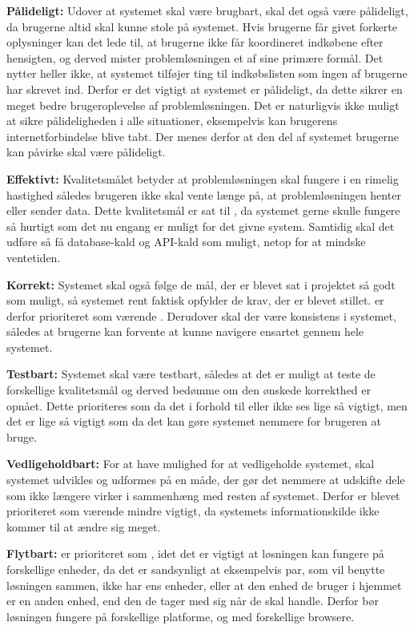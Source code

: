 \textbf{Pålideligt:}
Udover at systemet skal være brugbart, skal det også være pålideligt, da brugerne altid skal kunne stole på systemet. Hvis brugerne får givet forkerte oplysninger kan det lede til, at brugerne ikke får koordineret indkøbene efter hensigten, og derved mister problemløsningen et af sine primære formål. Det nytter heller ikke, at systemet tilføjer ting til indkøbslisten som ingen af brugerne har skrevet ind. Derfor er det vigtigt at systemet er pålideligt, da dette sikrer en meget bedre brugeroplevelse af problemløsningen. Det er naturligvis ikke muligt at sikre pålideligheden i alle situationer, eksempelvis kan brugerens internetforbindelse blive tabt. Der menes derfor at den del af systemet brugerne kan påvirke skal være pålideligt.

\textbf{Effektivt:}
Kvalitetsmålet  betyder at problemløsningen skal fungere i en rimelig hastighed således brugeren ikke skal vente længe på, at problemløsningen henter eller sender data. Dette kvalitetsmål er sat til , da systemet gerne skulle fungere så hurtigt som det nu engang er muligt for det givne system. Samtidig skal det udføre så få database-kald og API-kald som muligt, netop for at mindske ventetiden.

\textbf{Korrekt:}
Systemet skal også følge de mål, der er blevet sat i projektet så godt som muligt, så systemet rent faktisk opfylder de krav, der er blevet stillet.  er derfor prioriteret som værende . Derudover skal der være konsistens i systemet, således at brugerne kan forvente at kunne navigere ensartet gennem hele systemet. 

\textbf{Testbart:}
Systemet skal være testbart, således at det er muligt at teste de forskellige kvalitetsmål og derved bedømme om den ønskede korrekthed er opnået. Dette prioriteres som  da det i forhold til  eller  ikke ses lige så vigtigt, men det er lige så vigtigt som  da det kan gøre systemet nemmere for brugeren at bruge.

\textbf{Vedligeholdbart:}
For at have mulighed for at vedligeholde systemet, skal systemet udvikles og udformes på en måde, der gør det nemmere at udskifte dele som ikke længere virker i sammenhæng med resten af systemet. Derfor er  blevet prioriteret som værende mindre vigtigt, da systemets informationskilde ikke kommer til at ændre sig meget.

\textbf{Flytbart:}
 er prioriteret som , idet det er vigtigt at løsningen kan fungere på forskellige enheder, da det er sandsynligt at eksempelvis par, som vil benytte løsningen sammen, ikke har ens enheder, eller at den enhed de bruger i hjemmet er en anden enhed, end den de tager med sig når de skal handle. Derfor bør løsningen fungere på forskellige platforme, og med forskellige browsere. 

